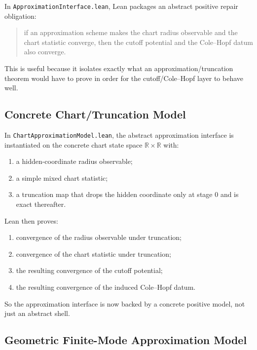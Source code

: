 \documentclass[11pt]{article}
\begin{document}
In \texttt{ApproximationInterface.lean}, Lean packages an abstract positive
repair obligation:
\begin{quote}
if an approximation scheme makes the chart radius observable and the chart
statistic converge, then the cutoff potential and the Cole--Hopf datum also
converge.
\end{quote}

This is useful because it isolates exactly what an approximation/truncation
theorem would have to prove in order for the cutoff/Cole--Hopf layer to behave
well.

\subsection{Concrete Chart/Truncation Model}

In \texttt{ChartApproximationModel.lean}, the abstract approximation interface
is instantiated on the concrete chart state space \(\mathbb{R}\times\mathbb{R}\)
with:
\begin{enumerate}[leftmargin=1.5em]
  \item a hidden-coordinate radius observable;
  \item a simple mixed chart statistic;
  \item a truncation map that drops the hidden coordinate only at stage \(0\)
  and is exact thereafter.
\end{enumerate}

Lean then proves:
\begin{enumerate}[leftmargin=1.5em]
  \item convergence of the radius observable under truncation;
  \item convergence of the chart statistic under truncation;
  \item the resulting convergence of the cutoff potential;
  \item the resulting convergence of the induced Cole--Hopf datum.
\end{enumerate}

So the approximation interface is now backed by a concrete positive model, not
just an abstract shell.

\subsection{Geometric Finite-Mode Approximation Model}
\end{document}
